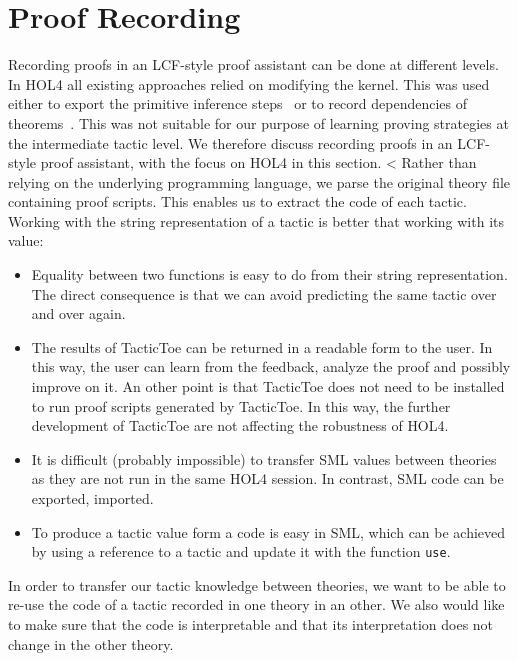 \documentclass[runningheads,a4paper,draft]{svjour3}
\def\holfour{\textsf{HOL4}\xspace}
\def\sml{\textsf{SML}\xspace}
\def\tactictoe{\textsf{TacticToe}\xspace}
\begin{document}
\section{Proof Recording}\label{sec:recording}
Recording proofs in an LCF-style proof assistant can be done at different
levels.
In \holfour all existing approaches relied on modifying the kernel. This was
used
either to export the primitive inference
steps~\cite{Wong95recordingand,DBLP:conf/itp/KumarH12}
or to record dependencies of theorems~\cite{tgck-cpp15}. This was not suitable
for our
purpose of learning proving strategies at the intermediate tactic level. We
therefore
discuss recording proofs in an LCF-style proof assistant, with the focus on
\holfour
in this section.
<
Rather than relying on the underlying programming language, we parse the
original theory file containing proof scripts. This enables us to extract the
code of each tactic.
Working with the string representation of a tactic is better that working with
its value:
\begin{itemize}
\item Equality between two functions is easy to do from
their string representation. The direct consequence is that we can avoid
predicting the same tactic over and over again.
\item
The
results of
\tactictoe can be returned in a readable form to the user. In this way, the
user can learn from the feedback, analyze the proof and possibly improve on it.
An other point is that \tactictoe does not need to be installed to run
proof scripts generated by \tactictoe. In this way, the further development of
\tactictoe are not affecting the robustness of \holfour.
\item
It is difficult (probably impossible) to transfer \sml values
between theories as they are not run in the same \holfour session. In contrast,
\sml code can be exported, imported.
\item To produce a tactic value form a code is easy in \sml, which can be
achieved by using a reference to a tactic and update it with the function
\texttt{use}.
\end{itemize}

In order to transfer our tactic knowledge between theories, we want to be able
to re-use the code of a tactic recorded in one theory in an
other. We also would like to make sure that the code is interpretable and that
its interpretation does not change in the other theory.
\end{document}

